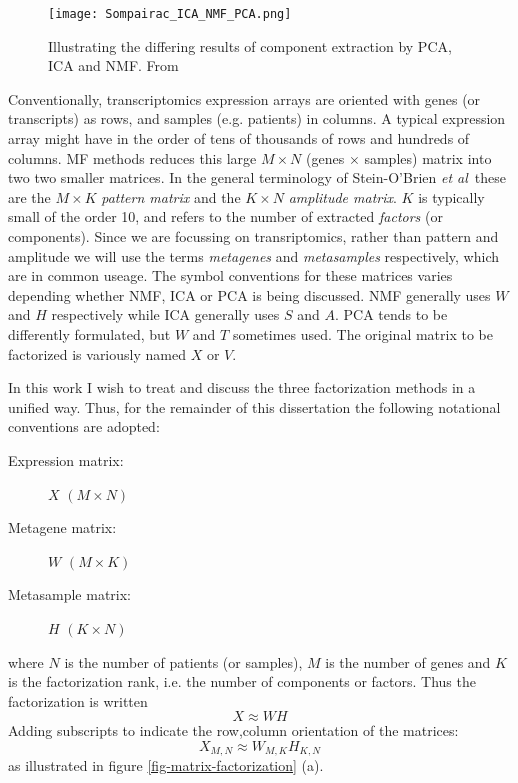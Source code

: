 \documentclass[draft, tikz, 12pt,a4paper,oneside,fleqn]{article}
\newcommand{\etal}{{\em et al\/}}
\begin{document}
\begin{figure}
\begin{center}
\texttt{[image: Sompairac\_ICA\_NMF\_PCA.png]}
\end{center}
\caption{Illustrating the differing results of component extraction by PCA, ICA and NMF.  From \cite{Sompairac2019}}
\label{fig-pca-ica-nmp-explanation}
\end{figure}


Conventionally, transcriptomics expression arrays are oriented with genes (or transcripts) as rows, and samples (e.g. patients) in columns.   
A typical expression array might have in the order of tens of thousands of rows and hundreds of columns.  
MF methods reduces this large $M \times N$ (genes $\times$ samples) matrix into two two smaller matrices.
In the general terminology of Stein-O'Brien \etal\ these are the $M \times K$ \emph{pattern matrix} and the $K \times N$ \emph{amplitude matrix}.  $K$ is typically small of the order 10, and refers to the number of extracted \emph{factors} (or components). 
Since we are focussing on transriptomics, rather than pattern and amplitude we will use the terms \emph{metagenes} and \emph{metasamples} respectively, which are in common useage.  The symbol conventions for these matrices varies depending whether NMF, ICA or PCA is being discussed.   NMF generally uses $W$ and $H$ respectively while ICA generally uses $S$ and $A$.  PCA tends to be differently formulated, but $W$ and $T$ sometimes used.   The original matrix to be factorized is variously named $X$ or $V$.

In this work I wish to treat and discuss the three factorization methods in a unified way.  Thus, for the remainder of this dissertation the following notational conventions are adopted:
\begin{description}
\item[Expression matrix:] $X$ $(M \times N)$
\item[Metagene matrix:] $W$ $(M \times K)$
\item[Metasample matrix:] $H$ $(K \times N)$
\end{description}
where $N$ is the number of patients (or samples), $M$ is the number of genes and $K$ is the factorization rank, i.e. the number of components or factors.  Thus the factorization is written
\begin{equation}
X \approx W H
\end{equation}
Adding subscripts to indicate the row,column orientation of the matrices:
\begin{equation}
X_{M,N} \approx W_{M,K} H_{K,N}
\end{equation}
as illustrated in figure \ref{fig-matrix-factorization} (a).
\end{document}
